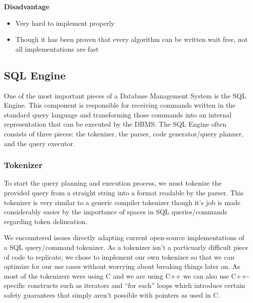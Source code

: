 \documentclass[letterpaper, 12pt]{article}
\begin{document}
{\bfseries Disadvantage}
\par\vspace{\baselineskip}
\begin{itemize}
	\item Very hard to implement properly
	\item Though it has been proven that every algorithm can be written wait free, not all implementations are fast
\end{itemize}

\newpage
\subsection{SQL Engine}
One of the most important pieces of a Database Management System is the SQL Engine.
This component is responsible for receiving commands written in the standard query
language and transforming those commands into an internal representation that can be
executed by the DBMS. The SQL Engine often consists of three pieces: the tokenizer, the
parser, code generator/query planner, and the query executor.

\subsubsection{Tokenizer}
To start the query planning and execution process, we must tokenize the provided query
from a straight string into a format readable by the parser. This tokenizer is very
similar to a generic compiler tokenizer though it's job is made considerably easier
by the importance of spaces in SQL queries/commands regarding token delineation.
\par\vspace{\baselineskip}
We encountered issues directly adapting current open-source implementations of a
SQL query/command tokenizer. As a tokenizer isn't a particuarly difficult piece of
code to replicate, we chose to implement our own tokenizer so that
we can optimize for our use cases without worrying about breaking things later on.
As most of the tokenizers were using C and we are using C++ we can also use C++-specific
constructs such as iterators and ``for each'' loops which introduce certain safety guarantees
that simply aren't possible with pointers as used in C.
\end{document}
